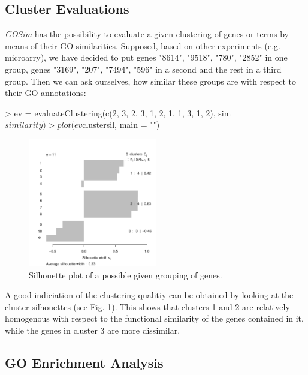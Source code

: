\documentclass[12pt,a4paper]{article}
\begin{document}
\subsection{Cluster Evaluations}

\emph{GOSim} has the possibility to evaluate a given clustering of genes or terms by means of their GO similarities. Supposed, based on other experiments (e.g. microarry), we have decided to put genes "8614", "9518", "780", "2852" in one group, genes "3169", "207", "7494", "596" in a second and the rest in a third group. Then we can ask ourselves, how similar these groups are with respect to their GO annotations:
\begin{Schunk}
\begin{Sinput}
> ev = evaluateClustering(c(2, 3, 2, 3, 1, 2, 1, 1, 3, 1, 2), sim$similarity)
> plot(ev$clustersil, main = "")
\end{Sinput}
\end{Schunk}
\begin{figure}[t]
\begin{center}
\includegraphics[width=0.5\textwidth]{GOClustersil.pdf}
\caption{\label{Fig:GOClustersil}Silhouette plot of a possible given grouping of genes.}
\end{center}
\end{figure}

A good indiciation of the clustering qualitiy can be obtained by looking at the cluster silhouettes \cite{rousseeuw87} (see Fig. \ref{Fig:GOClustersil}). This shows that clusters 1 and 2 are relatively homogenous with respect to the functional similarity of the genes contained in it, while the genes in cluster 3 are more dissimilar.

\subsection{GO Enrichment Analysis}
\end{document}
